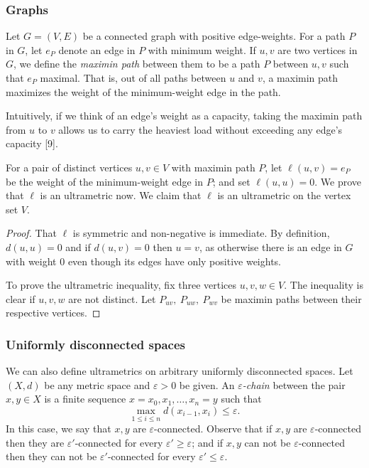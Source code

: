 \subsubsection{Graphs} Let \( G = (V,E) \) be a connected graph with positive edge-weights. For a path \( P \) in \( G \), let \( e_{P} \) denote an edge in \( P \) with minimum weight. If \( u , v  \) are two vertices in \( G \), we define the \emph{maximin path} between them to be a path \( P \) between \( u, v \) such that \( e_{P}  \) maximal. That is, out of all paths between \( u \) and \( v \), a maximin path maximizes the weight of the minimum-weight edge in the path.

Intuitively, if we think of an edge's weight as a capacity, taking the maximin path from \( u \) to \( v \) allows us to carry the heaviest load without exceeding any edge's capacity [9].

For a pair of distinct vertices \( u, v \in V \) with maximin path \( P \), let \( \ell(u, v) = e_{P} \) be the weight of the minimum-weight edge in \( P \); and set \( \ell(u, u) = 0 \). We prove that \( \ell \) is an ultrametric now. We claim that \( \ell \) is an ultrametric on the vertex set \( V \).

\begin{proof}
That \( \ell \) is symmetric and non-negative is immediate. By definition, \( d(u, u) = 0 \) and if \( d(u, v) = 0 \) then \( u = v \), as otherwise there is an edge in \( G \) with weight 0 even though its edges have only positive weights.

To prove the ultrametric inequality, fix three vertices \( u, v , w \in V \). The inequality is clear if \( u,v,w \) are not distinct. Let \( P_{uv}, \ P_{uw} , \ P_{wv}   \) be maximin paths between their respective vertices. 
\end{proof}

\subsubsection{Uniformly disconnected spaces} We can also define ultrametrics on arbitrary uniformly disconnected spaces.
Let \( (X,d) \) be any metric space and \( \varepsilon > 0 \) be given. An \emph{\( \varepsilon  \)-chain} between the pair \( x,y \in X \) is a finite sequence \( x = x_0 , x_1, \hdots , x_{n} = y  \) such that \[\max_{1 \leq i \leq n}  d(x_{i-1} , x_{i}) \leq \varepsilon. \] In this case, we say that \( x, y \) are \( \varepsilon  \)-connected. Observe that if \( x, y \) are \( \varepsilon  \)-connected then they are \( \varepsilon ' \)-connected for every \( \varepsilon ' \geq \varepsilon  \); and if \( x, y \) can not be \( \varepsilon  \)-connected then they can not be \( \varepsilon ' \)-connected for every \( \varepsilon ' \leq \varepsilon  \).


